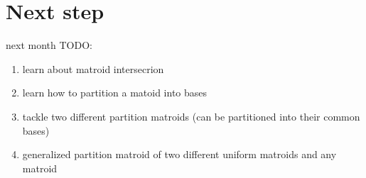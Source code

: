 \documentclass[11pt,xcolor=dvipsnames,table,dvipdfmx]{beamer}
\begin{document}
\section{Next step}
\begin{frame}{next month}
 TODO:
 \begin{enumerate}
  \item learn about matroid intersecrion
  \item learn how to partition a matoid into bases
  \item tackle two different partition matroids (can be partitioned into their common bases)
  \item generalized partition matroid of two different uniform matroids and any matroid
 \end{enumerate}
\end{frame}
\end{document}
